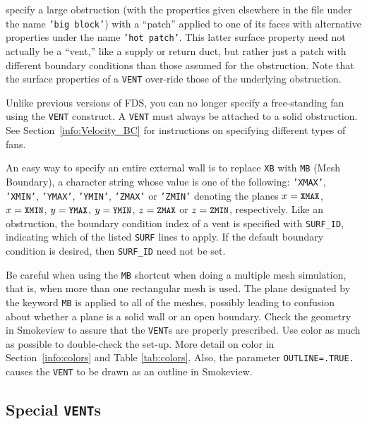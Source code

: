 \documentclass[11pt]{book}
\newcommand{\ct}{\tt\small}
\begin{document}
\noindent
specify a large obstruction (with the properties given elsewhere in the file under the name {\ct 'big block'}) with
a ``patch'' applied to one of its faces with alternative properties under the name {\ct 'hot patch'}. This latter
surface property need not actually be a ``vent,'' like a supply or return duct, but rather just a patch with different boundary
conditions than those assumed for the obstruction. Note that the surface properties of a {\ct VENT} over-ride those of the
underlying obstruction.

\begin{warning}
Unlike previous versions of FDS, you can no longer specify a free-standing fan using the {\ct VENT}
construct. A {\ct VENT} must always be attached to a solid obstruction. See
Section~\ref{info:Velocity_BC} for instructions on specifying different types of fans.
\end{warning}

\noindent
An easy way to specify an entire external wall is to replace {\ct XB} with
{\ct MB} (Mesh Boundary), a character string whose value is one of the following:
{\ct 'XMAX'}, {\ct 'XMIN'}, {\ct 'YMAX'}, {\ct 'YMIN'}, {\ct 'ZMAX'} or
{\ct 'ZMIN'} denoting the planes $x=\hbox{\ct XMAX}$, $x=\hbox{\ct XMIN}$,
$y=\hbox{\ct YMAX}$, $y=\hbox{\ct YMIN}$, $z=\hbox{\ct ZMAX}$
or $z=\hbox{\ct ZMIN}$, respectively.
Like an obstruction, the boundary condition index of a vent is specified
with {\ct SURF\_ID}, indicating which of the listed {\ct SURF} lines to
apply. If the default boundary condition is desired, then {\ct SURF\_ID} need not be set.

Be careful when using the {\ct MB} shortcut when doing a multiple mesh
simulation, that is, when more than one rectangular mesh is used. The
plane designated by the keyword {\ct MB} is applied to all of the
meshes, possibly leading to confusion about whether a plane is a solid
wall or an open boundary. Check the geometry in Smokeview to assure that
the {\ct VENT}s are properly prescribed. Use color as much as
possible to double-check the set-up.  More detail on color in
Section~\ref{info:colors} and Table \ref{tab:colors}. Also, the parameter {\ct OUTLINE=.TRUE.} causes the
{\ct VENT} to be drawn as an outline in Smokeview.


\subsection{Special \texorpdfstring{{\tt VENT}s}{VENTs}}

\label{info:Special_VENTS}
\end{document}
